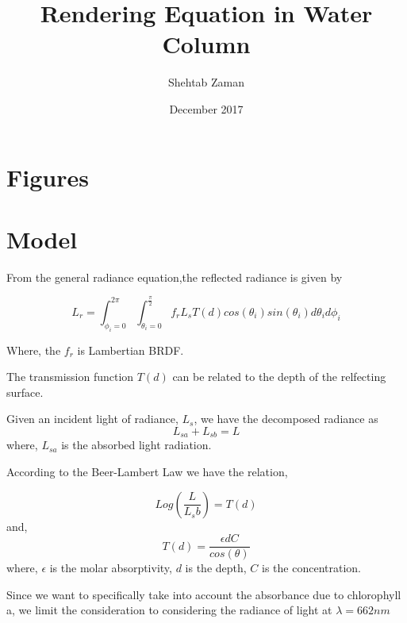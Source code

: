 \documentclass{article}
\title{Rendering Equation in Water Column}
\author{Shehtab Zaman }
\date{December 2017}
\begin{document}
\section{Figures}
\section{Model}

From the general radiance equation,the reflected radiance is given by

\begin{equation}
  L_r = \int^{2\pi}_{\phi_i = 0}\int^{\frac{\pi}{2}}_{\theta_i = 0}
  f_r L_s T(d)cos(\theta_i)sin(\theta_i)d\theta_i d\phi_i
\end{equation}

Where, the $ f_r$ is Lambertian BRDF.

The transmission function $T(d)$ can be related to the depth of the relfecting
surface.

Given an incident light of radiance, $L_s$,
we have the decomposed radiance as
$$L_{sa} + L_{sb} = L$$
where, $ L_{sa}$ is the absorbed light radiation.



According to the Beer-Lambert Law we have the relation,

\begin{equation}
  Log\left(\frac{L}{L_sb}\right) = T(d)
\end{equation}
and,
\begin{equation}
  T(d) = \frac{\epsilon d C}{cos(\theta)}
\end{equation}
where, $\epsilon$ is the molar absorptivity, $ d$ is the depth, $ C$ is the concentration.

Since we want to specifically take into account the
absorbance due to chlorophyll a, we limit the consideration
to considering the radiance of light at $\lambda = 662nm$
\end{document}

